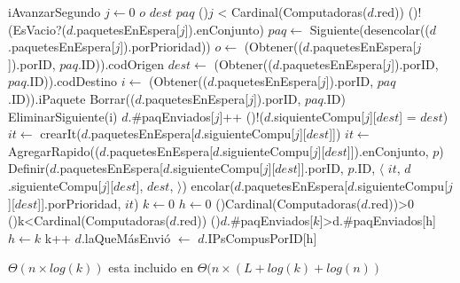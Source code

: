 \begin{Algoritmos}
  \begin{algoritmo}{iAvanzarSegundo}{}{}
     $j \gets 0$
     $o$
     $dest$
     $paq$
    \While(){$j$ < Cardinal(Computadoras($d$.red))}{
      \If(){!(EsVacio?($d$.paquetesEnEspera[$j$]).enConjunto)}{
        $paq \gets$ Siguiente(desencolar(($d$.paquetesEnEspera[$j$]).porPrioridad))
        $o \gets$ (Obtener(($d$.paquetesEnEspera[$j$]).porID, $paq$.ID)).codOrigen
        $dest \gets$ (Obtener(($d$.paquetesEnEspera[$j$]).porID, $paq$.ID)).codDestino
        $i \gets$ (Obtener(($d$.paquetesEnEspera[$j$]).porID, $paq$.ID)).iPaquete
        Borrar(($d$.paquetesEnEspera[$j$]).porID, $paq$.ID)
        EliminarSiguiente(i)
        $d$.\#paqEnviados[$j$]++
        \If(){!($d$.siquienteCompu[$j$][$dest$] = $dest$)}{
          $it \gets$ crearIt($d$.paquetesEnEspera[$d$.siguienteCompu[$j$][$dest$]])
          $it \gets$ AgregarRapido(($d$.paquetesEnEspera[$d$.siguienteCompu[$j$][$dest$]]).enConjunto, $p$)
          Definir($d$.paquetesEnEspera[$d$.siguienteCompu[$j$][$dest$]].porID, $p$.ID, $\langle$ $it$, $d$.siguienteCompu[$j$][$dest$], $dest$, $\rangle$)
          encolar($d$.paquetesEnEspera[$d$.siguienteCompu[$j$][$dest$]].porPrioridad, $it$)
        }
      }
    }
     $k \gets 0$
     $h \gets 0$
    \If(){Cardinal(Computadoras($d$.red))>0}{
      \While(){k<Cardinal(Computadoras($d$.red))}{
        \If(){$d$.\#paqEnviados[$k$]>d.\#paqEnviados[h]}{
          $h \gets k$
          k++
        }
      }
    }
    $d$.laQueM\'asEnvi\'o $\gets$ $d$.IPsCompusPorID[h]
  \end{algoritmo}
  \datosAlgoritmo{} %
  {} %
  {} %
  {$\Theta(n \times log(k))$ esta incluido en $\Theta(n \times (L+log(k)+log(n))$} %
  {} %



\end{Algoritmos}
